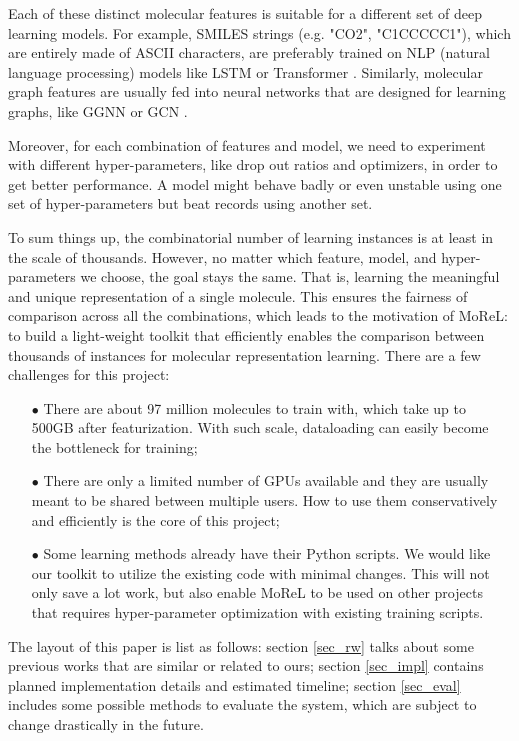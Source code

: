 \documentclass[conference]{IEEEtran}
\begin{document}
Each of these distinct molecular features is suitable for a different set of deep learning models. 
For example, SMILES strings (e.g. "CO2", "C1CCCCC1"), which are entirely made of ASCII characters, are preferably trained on NLP (natural language processing) models like LSTM \cite{lstm} or Transformer \cite{transformer}. 
Similarly, molecular graph features are usually fed into neural networks that are designed for learning graphs, like GGNN \cite{ggnn} or GCN \cite{gcn}. 

Moreover, for each combination of features and model, we need to experiment with different hyper-parameters, like drop out ratios and optimizers, in order to get better performance. 
A model might behave badly or even unstable using one set of hyper-parameters but beat records using another set. 

To sum things up, the combinatorial number of learning instances is at least in the scale of thousands. 
However, no matter which feature, model, and hyper-parameters we choose, the goal stays the same. That is, learning the meaningful and unique representation of a single molecule. 
This ensures the fairness of comparison across all the combinations, which leads to the motivation of MoReL: to build a light-weight toolkit that efficiently enables the comparison between thousands of instances for molecular representation learning. 
There are a few challenges for this project:
\begin{itemize}
	\item[$\bullet$]  There are about 97 million molecules to train with, which take up to 500GB after featurization. With such scale, dataloading can easily become the bottleneck for training; 
	\item[$\bullet$]  There are only a limited number of GPUs available and they are usually meant to be shared between multiple users. How to use them conservatively and efficiently is the core of this project; 
	\item[$\bullet$]  Some learning methods already have their Python scripts. We would like our toolkit to utilize the existing code with minimal changes. This will not only save a lot work, but also enable MoReL to be used on other projects that requires hyper-parameter optimization with existing training scripts. 
\end{itemize}

The layout of this paper is list as follows: 
section \ref{sec_rw} talks about some previous works that are similar or related to ours; 
section \ref{sec_impl} contains planned implementation details and estimated timeline; 
section \ref{sec_eval} includes some possible methods to evaluate the system, which are subject to change drastically in the future. 
\end{document}
